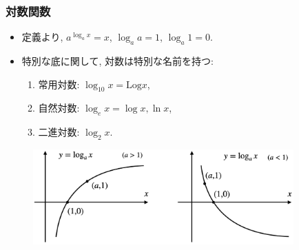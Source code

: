 \documentclass[dvipdfmx,cjk,10.2pt]{beamer}
\theoremstyle{definition}
\begin{document}


\begin{frame}
\frametitle{対数関数}   

\begin{itemize}
\item 定義より, $a^{\log_a x}=x$, $\log_a a=1$, $\log_a 1=0$. 
\item 特別な底に関して, 対数は特別な名前を持つ: 
\begin{enumerate}
\item 常用対数: $\log_{10} x=\mathrm{Log} x$, 
\item 自然対数: $\log_e x=\log x, \ln x$, 
\item 二進対数: $\log_2 x$.  
\end{enumerate}
\end{itemize}

\vspace{-1mm}

\begin{figure}[htbp]
 \begin{center} 
  \includegraphics[width=100mm]{log.png}
 \end{center}
\end{figure}
\vspace{-4mm}

\end{frame}



\end{document}
